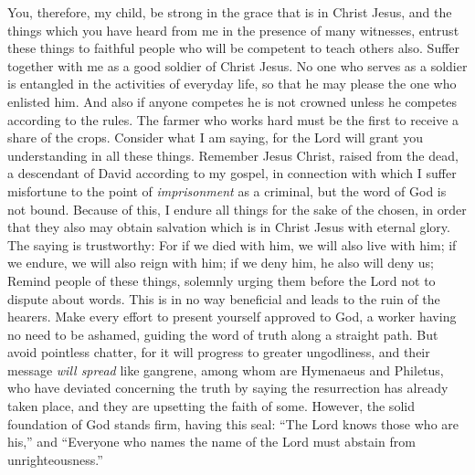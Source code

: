 \begin{biblechapter} %
 You, therefore, my child, be strong in the grace that is in Christ Jesus,
\verse and the things which you have heard from me in the presence of many witnesses, entrust these things to faithful people who will be competent to teach others also.
\verse Suffer together with me as a good soldier of Christ Jesus.
\verse No one who serves as a soldier is entangled in the activities of everyday life, so that he may please the one who enlisted him.
\verse And also if anyone competes he is not crowned unless he competes according to the rules.
\verse The farmer who works hard must be the first to receive a share of the crops.
\verse Consider what I am saying, for the Lord will grant you understanding in all these things.
 Remember Jesus Christ, raised from the dead, a descendant of David according to my gospel,
\verse in connection with which I suffer misfortune to the point of \textit{imprisonment} as a criminal, but the word of God is not bound.
\verse Because of this, I endure all things for the sake of the chosen, in order that they also may obtain salvation which is in Christ Jesus with eternal glory.
\verse The saying is trustworthy:
\verse For if we died with him, we will also live with him;
\verse if we endure, we will also reign with him; 
if we deny him, he also will deny us;
 Remind people of these things, solemnly urging them before the Lord not to dispute about words. This is in no way beneficial and leads to the ruin of the hearers.
\verse Make every effort to present yourself approved to God, a worker having no need to be ashamed, guiding the word of truth along a straight path.
\verse But avoid pointless chatter, for it will progress to greater ungodliness,
\verse and their message \textit{will spread} like gangrene, among whom are Hymenaeus and Philetus,
\verse who have deviated concerning the truth by saying the resurrection has already taken place, and they are upsetting the faith of some.
\verse However, the solid foundation of God stands firm, having this seal: “The Lord knows those who are his,” and “Everyone who names the name of the Lord must abstain from unrighteousness.”

\end{biblechapter}
